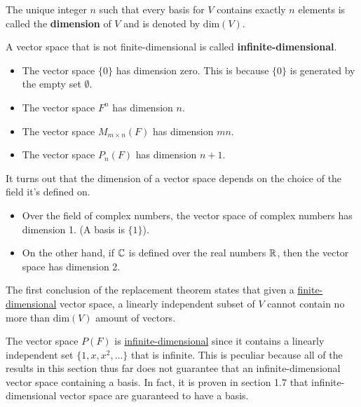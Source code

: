 \begin{definition}\label{Dimension}
    The unique integer \( n \) such that every basis for \( V  \) contains exactly \( n  \) elements is called the \textbf{dimension} of \( V  \) and is denoted by \( \text{dim}(V) \). 
\end{definition}

\begin{definition}\label{Infinite-dimensional}
    A vector space that is not finite-dimensional is called \textbf{infinite-dimensional}.
\end{definition}

\begin{eg}
    \begin{itemize}
        \item The vector space \( \{ 0 \}   \) has dimension zero. This is because \( \{ 0 \}  \) is generated by the empty set \( \emptyset \).
        \item The vector space \( F^{n}  \) has dimension \( n \).
        \item The vector space \( M_{m \times n}(F)  \) has dimension \( mn \).
        \item The vector space \( P_{n}(F) \) has dimension \( n + 1  \).
    \end{itemize}
\end{eg}

It turns out that the dimension of a vector space depends on the choice of the field it's defined on.


\begin{eg}
    \begin{itemize}
        \item Over the field of complex numbers, the vector space of complex numbers has dimension 1. (A basis is \( \{ 1 \}  \)).
        \item On the other hand, if \( \mathbb{C}  \) is defined over the real numbers \( \mathbb{R}  \), then the vector space has dimension 2.
    \end{itemize}
\end{eg}

The first conclusion of the replacement theorem states that given a {\hyperref[Finite-dimensional]{finite-dimensional}} vector space, a linearly independent subset of \( V  \) cannot contain no more than \( \text{dim}(V) \) amount of vectors. 

\begin{eg}
    The vector space \( P(F) \) is {\hyperref[Infinite-dimensional]{infinite-dimensional}} since it contains a linearly independent set \( \{ 1,x,x^{2}, \dots \}  \) that is infinite. This is peculiar because all of the results in this section thus far does not guarantee that an infinite-dimensional vector space containing a basis. In fact, it is proven in section 1.7 that infinite-dimensional vector space are guaranteed to have a basis.
\end{eg}

